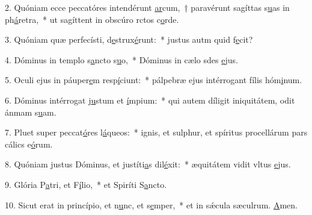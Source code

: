 2. Quóniam ecce peccatóres intendérunt \uline{ar}cum,~† paravérunt sagíttas s\uline{u}as in ph\uline{á}retra,~* ut sagíttent in obscúro rctos c\uline{o}rde.\par 
3. Quóniam quæ perfecísti, d\uline{e}strux\uline{é}runt:~* justus autm quid f\uline{e}cit?\par 
4. Dóminus in templo s\uline{a}ncto s\uline{u}o,~* Dóminus in cælo sdes \uline{e}jus.\par 
5. Oculi ejus in páuper\uline{e}m resp\uline{í}ciunt:~* pálpebræ ejus intérrogant fílis hóm\uline{i}num.\par 
6. Dóminus intérrogat j\uline{u}stum et \uline{í}mpium:~* qui autem díligit iniquitátem, odit ánmam s\uline{u}am.\par 
7. Pluet super peccat\uline{ó}res l\uline{á}queos:~* ignis, et sulphur, et spíritus procellárum pars cálics e\uline{ó}rum.\par 
8. Quóniam justus Dóminus, et justíti\uline{a}s dil\uline{é}xit:~* æquitátem vidit vltus \uline{e}jus.\par 
9. Glória P\uline{a}tri, et F\uline{í}lio,~* et Spiríti S\uline{a}ncto.\par 
10. Sicut erat in princípio, et n\uline{u}nc, et s\uline{e}mper,~* et in sǽcula sæculrum. \uline{A}men.\par 
